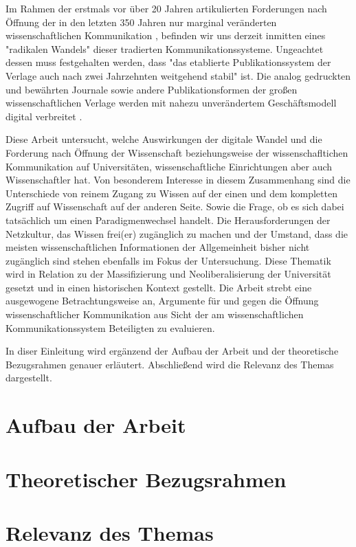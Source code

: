 Im Rahmen der erstmals vor über 20 Jahren artikulierten Forderungen nach Öffnung der in den letzten 350 Jahren nur marginal veränderten wissenschaftlichen Kommunikation \cite{poynder_2011_suber bzw suchen}, befinden wir uns derzeit inmitten eines "radikalen Wandels" \cite{poynder_2011_suber} dieser tradierten Kommunikationssysteme. Ungeachtet dessen muss festgehalten werden, dass "das etablierte Publikationssystem der Verlage auch nach zwei Jahrzehnten weitgehend stabil" \cite{Hanekop_2014} ist. Die analog gedruckten und bewährten Journale sowie andere Publikationsformen der großen wissenschaftlichen Verlage werden mit nahezu unverändertem Geschäftsmodell digital verbreitet \cite{Hanekop_2014} \cite{boai_2012}.

Diese Arbeit untersucht, welche Auswirkungen der digitale Wandel und die Forderung nach Öffnung der Wissenschaft beziehungsweise der wissenschafltichen Kommunikation auf Universitäten, wissenschaftliche Einrichtungen aber auch Wissenschaftler hat. Von besonderem Interesse in diesem Zusammenhang sind die Unterschiede von reinem Zugang zu Wissen auf der einen und dem kompletten Zugriff auf Wissenschaft auf der anderen Seite. Sowie die Frage, ob es sich dabei tatsächlich um einen Paradigmenwechsel handelt. Die Herausforderungen der Netzkultur, das Wissen frei(er) zugänglich zu machen und der Umstand, dass die meisten wissenschaftlichen Informationen der Allgemeinheit bisher nicht zugänglich sind \cite{cite:6} stehen ebenfalls im Fokus der Untersuchung. Diese Thematik wird in Relation zu der Massifizierung und Neoliberalisierung der Universität gesetzt und in einen historischen Kontext gestellt. Die Arbeit strebt eine ausgewogene Betrachtungsweise an, Argumente für und gegen die Öffnung wissenschaftlicher Kommunikation aus Sicht der am wissenschaftlichen Kommunikationssystem Beteiligten zu evaluieren.

In diser Einleitung wird ergänzend der Aufbau der Arbeit und der theoretische Bezugsrahmen genauer erläutert. Abschließend wird die Relevanz des Themas dargestellt.
\section{Aufbau der Arbeit} 

\section{Theoretischer Bezugsrahmen} 

\section{Relevanz des Themas} 